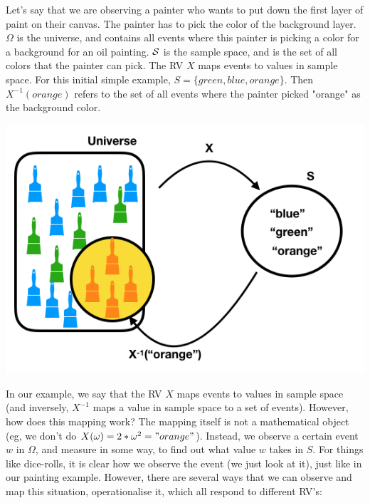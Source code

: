 \begin{example}
Let's say that we are observing a painter who wants to put down the first layer of paint on their canvas. The painter has to pick the color of the background layer. $\Omega$ is the universe, and contains all events where this painter is picking a color for a background for an oil painting. $\S$ is the sample space, and is the set of all colors that the painter can pick. The RV $X$ maps events to values in sample space. For this initial simple example, $S = \{green, blue, orange\}$. Then $X^{-1}(orange)$ refers to the set of all events where the painter picked "orange" as the background color.

\includegraphics[width=\linewidth]{images/rv2.png}
\end{example}

In our example, we say that the RV $X$ maps events to values in sample space (and inversely, $X^{-1}$ maps a value in sample space to a set of events). However, how does this mapping work? The mapping itself is not a mathematical object (eg, we don't do $X(\omega) = 2*\omega^2 = "orange"$). Instead, we observe a certain event $w$ in $\Omega$, and measure in some way, to find out what value $w$ takes in $S$. For things like dice-rolls, it is clear how we observe the event (we just look at it), just like in our painting example. However, there are several ways that we can observe and map this situation, operationalise it, which all respond to different RV's:

